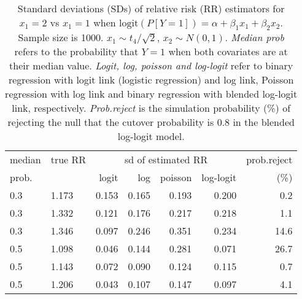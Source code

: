 \documentclass[12pt,a4paper]{article}
\begin{document}
\begin{table}[H] 
\small\sf\centering 
\caption{Standard deviations (SDs) of relative risk (RR) estimators for $x_1=2$ vs $x_1=1$ when $\mbox{logit}(P[Y=1])=\alpha+\beta_1 x_1 + \beta_2 x_2$. Sample size is 1000. $x_1 \sim $$t_4/\sqrt{2}$, $x_2 \sim N(0,1)$. {\it Median prob} refers to the probability that $Y=1$ when both covariates are at their median value. {\it Logit, log, poisson and log-logit} refer to binary regression with logit link (logistic regression) and log link, Poisson regression with log link and binary regression with blended log-logit link, respectively. {\it Prob.reject} is the simulation probability (\%) of rejecting the null that the cutover probability is $0.8$ in the blended log-logit model.} 
\begin{tabular}{llrrrrr} 
\toprule 
median & true RR & \multicolumn{4}{c}{sd of estimated RR} & prob.reject \\ 
prob. & & logit & log & poisson & log-logit  & (\%) \\ \midrule 
0.3 & 1.173 & 0.153 & 0.165 & 0.193 & 0.200 &  0.2 \\  
0.3 & 1.332 & 0.121 & 0.176 & 0.217 & 0.218 &  1.1 \\  
0.3 & 1.346 & 0.097 & 0.246 & 0.351 & 0.234 & 14.6 \\  
0.5 & 1.098 & 0.046 & 0.144 & 0.281 & 0.071 & 26.7 \\  
0.5 & 1.143 & 0.072 & 0.090 & 0.124 & 0.115 &  0.7 \\  
0.5 & 1.206 & 0.043 & 0.107 & 0.147 & 0.097 &  4.1 \\  
\bottomrule 
\end{tabular} 
\end{table} 
\end{document}
